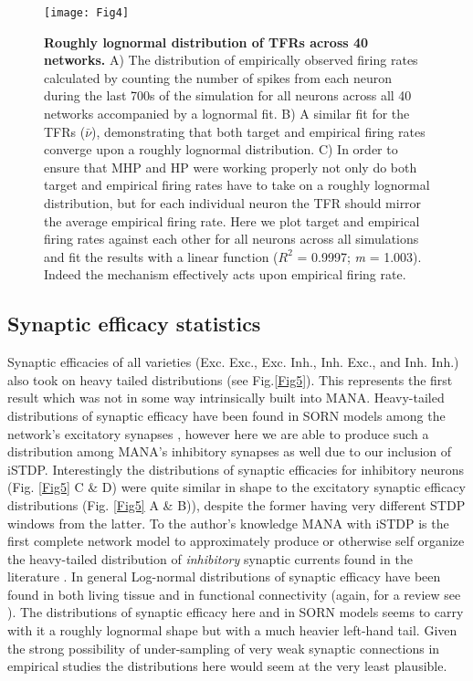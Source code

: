 \documentclass[10pt,letterpaper]{article}
\begin{document}
		
\begin{figure}[!h]
	\texttt{[image: Fig4]}
	\caption{{\bf Roughly lognormal distribution of TFRs across 40 networks.}
	A) The distribution of empirically observed firing rates calculated by counting the number of spikes from each neuron during the last 700s of the simulation for all neurons across all 40 networks accompanied by a lognormal fit. B) A similar fit for the TFRs ($\bar{\nu}$), demonstrating that both target and empirical firing rates converge upon a roughly lognormal distribution. C) In order to ensure that MHP and HP were working properly not only do both target and empirical firing rates have to take on a roughly lognormal distribution, but for each individual neuron the TFR should mirror the average empirical firing rate. Here we plot target and empirical firing rates against each other for all neurons across all simulations and fit the results with a linear function ($R^2$ = 0.9997; \emph{m} = 1.003). Indeed the mechanism effectively acts upon empirical firing rate. }
	\label{Fig4}
\end{figure}
		
\subsection*{Synaptic efficacy statistics}
Synaptic efficacies of all varieties (Exc. \textrightarrow Exc., Exc. \textrightarrow Inh., Inh. \textrightarrow Exc., and Inh. \textrightarrow Inh.) also took on heavy tailed distributions (see Fig.\ref{Fig5}). This represents the first result which was not in some way intrinsically built into MANA. Heavy-tailed distributions of synaptic efficacy have been found in SORN models among the network's excitatory synapses \cite{miner2016plasticity}, however here we are able to produce such a distribution among MANA's inhibitory synapses as well due to our inclusion of iSTDP. Interestingly the distributions of synaptic efficacies for inhibitory neurons (Fig. \ref{Fig5} C \& D) were quite similar in shape to the excitatory synaptic efficacy distributions (Fig. \ref{Fig5} A \& B)), despite the former having very different STDP windows from the latter.  To the author's knowledge MANA with iSTDP is the first complete network model to approximately produce or otherwise self organize the heavy-tailed distribution of \emph{inhibitory} synaptic currents found in the literature \cite{borst1994large, brussaard1997plasticity, nusser1997differences}. In general Log-normal distributions of synaptic efficacy have been found in both living tissue \cite{song2005highly,lefort2009excitatory, feldmeyer2002synaptic} and in functional connectivity \cite{nigam2016} (again, for a review see \cite{buzsaki2014log}). The distributions of synaptic efficacy here and in SORN models \cite{miner2016plasticity} seems to carry with it a roughly lognormal shape but with a much heavier left-hand tail. Given the strong possibility of under-sampling of very weak synaptic connections in empirical studies the distributions here would seem at the very least plausible. 
	
\end{document}
